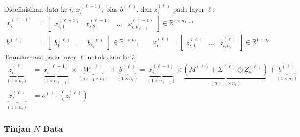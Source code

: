 \documentclass[11pt,a4paper]{article}
\def\mathbf#1{#1}%
\theoremstyle{plain}
\theoremstyle{definition}
\theoremstyle{remark}
\begin{document}
\noindent Didefinisikan data ke-$i$, $\mathbf{x}^{(\ell-1)}_i$, bias $\mathbf{b}^{(\ell)}$, dan $\mathbf{z}^{(\ell)}_i$ pada layer $\ell$:
\begin{align}
    \mathbf{x}^{(\ell-1)}_i &= \begin{bmatrix} x^{(\ell-1)}_{i, 1} & x^{(\ell-1)}_{i, 2} & \dots & x^{(\ell-1)}_{i, n_{\ell-1}} \end{bmatrix} \in \mathbb{R}^{1 \times n_{\ell-1}} \label{eq:single_data_vec_x} \\
    \mathbf{b}^{(\ell)} &= \begin{bmatrix} b^{(\ell)}_1 & \dots & b^{(\ell)}_{n_\ell} \end{bmatrix} \in \mathbb{R}^{1 \times n_\ell}, \qquad
    \mathbf{z}^{(\ell)}_i = \begin{bmatrix} z^{(\ell)}_{i, 1} & \dots & z^{(\ell)}_{i, n_\ell} \end{bmatrix} \in \mathbb{R}^{1 \times n_\ell} \label{eq:single_data_vecs}
\end{align}
Transformasi pada layer $\ell$ untuk data ke-$i$:
\begin{align}
    \underbrace{\mathbf{z}^{(\ell)}_i}_{(1 \times n_\ell)} &= \underbrace{\mathbf{x}^{(\ell-1)}_i}_{(1 \times n_{\ell-1})} \times \underbrace{W^{(\ell)}}_{(n_{\ell-1} \times n_\ell)} + \underbrace{\mathbf{b}^{(\ell)}}_{(1 \times n_\ell)} = \underbrace{\mathbf{x}^{(\ell-1)}_i}_{(1 \times n_{\ell-1})} \times \underbrace{\left( M^{(\ell)} + \Sigma^{(\ell)} \odot Z_w^{(\ell)} \right)}_{(n_{\ell-1} \times n_\ell)} + \underbrace{\mathbf{b}^{(\ell)}}_{(1 \times n_\ell)} \label{eq:single_data_z} \\
    \underbrace{\mathbf{x}^{(\ell)}_i}_{(1 \times n_\ell)} &= \sigma^{(\ell)}\!\left( \mathbf{z}^{(\ell)}_i \right) \label{eq:single_data_layer}
\end{align}

\subsubsection{Tinjau \texorpdfstring{$N$}{N} Data}
\label{subsubsec:forward_N_data}
\end{document}
